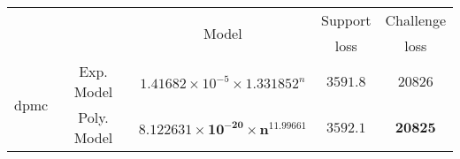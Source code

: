 \begin{tabular}{ccccc} 
\hline 
 &  & \multirow{2}{*}{Model} & Support & Challenge\tabularnewline 
 &  &  & loss  & loss\tabularnewline 
\hline 
\hline 
\multirow{2}{*}{dpmc} & Exp. Model & $1.41682\times10^{-5}\times 1.331852^{n}$ & $3591.8$ & $20826$ \tabularnewline 
 & Poly. Model & $\mathbf{8.122631\times10^{-20}\times n^{11.99661}}$ & $\mathbf{3592.1}$ & $\mathbf{20825}$ \tabularnewline 
\hline 
\end{tabular} 

